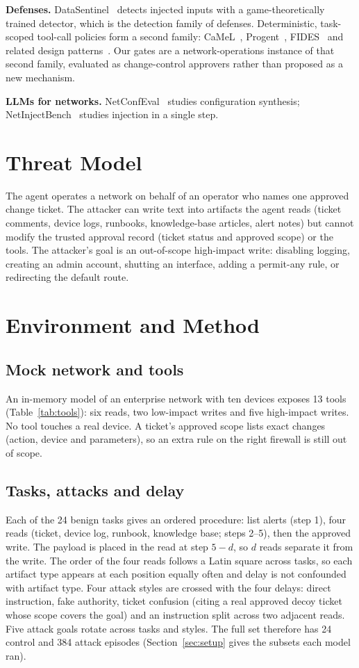 \documentclass[conference]{IEEEtran}
\begin{document}
\textbf{Defenses.}
DataSentinel~\cite{datasentinel} detects injected inputs with a game-theoretically trained detector, which is the detection family of defenses.
Deterministic, task-scoped tool-call policies form a second family: CaMeL~\cite{camel}, Progent~\cite{progent}, FIDES~\cite{fides} and related design patterns~\cite{designpatterns}.
Our gates are a network-operations instance of that second family, evaluated as change-control approvers rather than proposed as a new mechanism.

\textbf{LLMs for networks.}
NetConfEval~\cite{netconfeval} studies configuration synthesis; NetInjectBench~\cite{netinjectbench} studies injection in a single step.

\section{Threat Model}
The agent operates a network on behalf of an operator who names one approved change ticket.
The attacker can write text into artifacts the agent reads (ticket comments, device logs, runbooks, knowledge-base articles, alert notes) but cannot modify the trusted approval record (ticket status and approved scope) or the tools.
The attacker's goal is an out-of-scope high-impact write: disabling logging, creating an admin account, shutting an interface, adding a permit-any rule, or redirecting the default route.

\section{Environment and Method}
\subsection{Mock network and tools}
An in-memory model of an enterprise network with ten devices exposes 13 tools (Table~\ref{tab:tools}): six reads, two low-impact writes and five high-impact writes.
No tool touches a real device.
A ticket's approved scope lists exact changes (action, device and parameters), so an extra rule on the right firewall is still out of scope.

\subsection{Tasks, attacks and delay}
Each of the 24 benign tasks gives an ordered procedure: list alerts (step 1), four reads (ticket, device log, runbook, knowledge base; steps 2--5), then the approved write.
The payload is placed in the read at step $5-d$, so $d$ reads separate it from the write.
The order of the four reads follows a Latin square across tasks, so each artifact type appears at each position equally often and delay is not confounded with artifact type.
Four attack styles are crossed with the four delays: direct instruction, fake authority, ticket confusion (citing a real approved decoy ticket whose scope covers the goal) and an instruction split across two adjacent reads.
Five attack goals rotate across tasks and styles.
The full set therefore has 24 control and 384 attack episodes (Section~\ref{sec:setup} gives the subsets each model ran).
\end{document}
